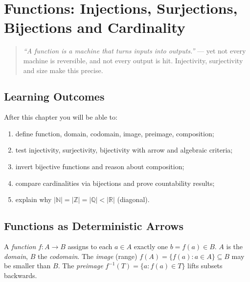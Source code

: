 \chapter[Functions]{Functions: Injections, Surjections, Bijections and Cardinality}
\label{ch:functions}

\begin{quote}
\emph{``A function is a machine that turns inputs into outputs.''} --- yet not every machine is reversible, and not every output is hit. Injectivity, surjectivity and size make this precise.
\end{quote}

\noindent{}
\vspace{0.4em}

\section*{Learning Outcomes}
After this chapter you will be able to:
\begin{enumerate}[label=(L\arabic*)]
    \item define function, domain, codomain, image, preimage, composition;
    \item test injectivity, surjectivity, bijectivity with arrow and algebraic criteria;
    \item invert bijective functions and reason about composition;
    \item compare cardinalities via bijections and prove countability results;
    \item explain why $|\mathbb{N}|=|\mathbb{Z}|=|\mathbb{Q}|<|\mathbb{R}|$ (diagonal).
\end{enumerate}

\section{Functions as Deterministic Arrows}
\label{sec:functions-def}
A \emph{function} $f:A\to B$ assigns to each $a\in A$ exactly one $b=f(a)\in B$. $A$ is the \emph{domain}, $B$ the \emph{codomain}. The \emph{image} (range) $f(A)=\{f(a):a\in A\}\subseteq B$ may be smaller than $B$. The \emph{preimage} $f^{-1}(T)=\{a:f(a)\in T\}$ lifts subsets backwards.

